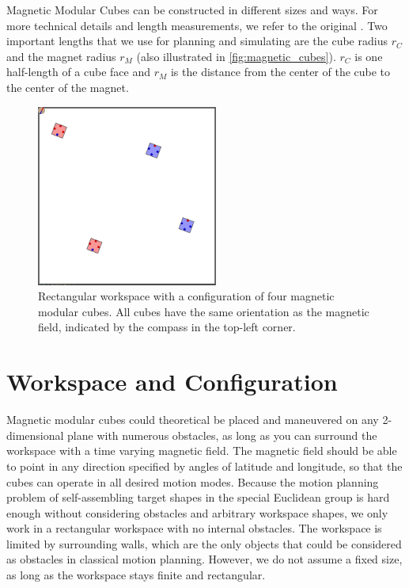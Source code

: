Magnetic Modular Cubes can be constructed in different sizes and ways. For more technical details and length measurements, we refer to the original \cite{Bhattacharjee2022}.
Two important lengths that we use for planning and simulating are the cube radius $r_C$ and the magnet radius $r_M$ (also illustrated in \autoref{fig:magnetic_cubes}).
$r_C$ is one half-length of a cube face and $r_M$ is the distance from the center of the cube to the center of the magnet.

\begin{figure}
	\centering
	\includegraphics[width=0.53\textwidth]{figures/workspace_config.png}
	\caption[Workspace with a configuration of four magnetic modular cubes]{Rectangular workspace with a configuration of four magnetic modular cubes. All cubes have the same orientation as the magnetic field, indicated by the compass in the top-left corner.}
	\label{fig:workspace_config}
\end{figure}

\section{Workspace and Configuration}
Magnetic modular cubes could theoretical be placed and maneuvered on any 2-dimensional plane with numerous obstacles, as long as you can surround the workspace with a time varying magnetic field.
The magnetic field should be able to point in any direction specified by angles of latitude and longitude, so that the cubes can operate in all desired motion modes.
Because the motion planning problem of self-assembling target shapes in the special Euclidean group is hard enough without considering obstacles and arbitrary workspace shapes, we only work in a rectangular workspace with no internal obstacles.
The workspace is limited by surrounding walls, which are the only objects that could be considered as obstacles in classical motion planning.
However, we do not assume a fixed size, as long as the workspace stays finite and rectangular.

